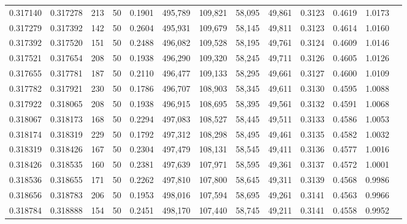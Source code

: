\begin{tabular}{rrrrrrrrrrrrr}
0.317140 & 0.317278 &   213 &  50 &                                     0.1901 & 495,789 & 109,821 &  58,095 &  49,861 & 0.3123 & 0.4619 & 1.0173 \\
0.317279 & 0.317392 &   142 &  50 &                                     0.2604 & 495,931 & 109,679 &  58,145 &  49,811 & 0.3123 & 0.4614 & 1.0160 \\
0.317392 & 0.317520 &   151 &  50 &                                     0.2488 & 496,082 & 109,528 &  58,195 &  49,761 & 0.3124 & 0.4609 & 1.0146 \\
0.317521 & 0.317654 &   208 &  50 &                                     0.1938 & 496,290 & 109,320 &  58,245 &  49,711 & 0.3126 & 0.4605 & 1.0126 \\
0.317655 & 0.317781 &   187 &  50 &                                     0.2110 & 496,477 & 109,133 &  58,295 &  49,661 & 0.3127 & 0.4600 & 1.0109 \\
0.317782 & 0.317921 &   230 &  50 &                                     0.1786 & 496,707 & 108,903 &  58,345 &  49,611 & 0.3130 & 0.4595 & 1.0088 \\
0.317922 & 0.318065 &   208 &  50 &                                     0.1938 & 496,915 & 108,695 &  58,395 &  49,561 & 0.3132 & 0.4591 & 1.0068 \\
0.318067 & 0.318173 &   168 &  50 &                                     0.2294 & 497,083 & 108,527 &  58,445 &  49,511 & 0.3133 & 0.4586 & 1.0053 \\
0.318174 & 0.318319 &   229 &  50 &                                     0.1792 & 497,312 & 108,298 &  58,495 &  49,461 & 0.3135 & 0.4582 & 1.0032 \\
0.318319 & 0.318426 &   167 &  50 &                                     0.2304 & 497,479 & 108,131 &  58,545 &  49,411 & 0.3136 & 0.4577 & 1.0016 \\
0.318426 & 0.318535 &   160 &  50 &                                     0.2381 & 497,639 & 107,971 &  58,595 &  49,361 & 0.3137 & 0.4572 & 1.0001 \\
0.318536 & 0.318655 &   171 &  50 &                                     0.2262 & 497,810 & 107,800 &  58,645 &  49,311 & 0.3139 & 0.4568 & 0.9986 \\
0.318656 & 0.318783 &   206 &  50 &                                     0.1953 & 498,016 & 107,594 &  58,695 &  49,261 & 0.3141 & 0.4563 & 0.9966 \\
0.318784 & 0.318888 &   154 &  50 &                                     0.2451 & 498,170 & 107,440 &  58,745 &  49,211 & 0.3141 & 0.4558 & 0.9952 \\

\end{tabular}

